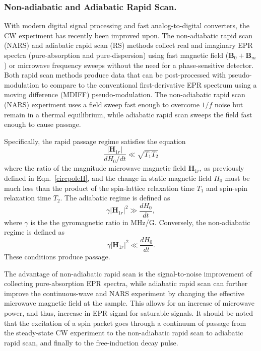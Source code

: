 \subsubsection*{Non-adiabatic and Adiabatic Rapid Scan.}
With modern digital signal processing and fast analog-to-digital converters, the CW experiment has recently been improved upon. The non-adiabatic rapid scan (NARS) \cite{KITTELL2011228, KITTELL201251, KITTELL201568, Hyde2013MDIFF, YU201558} and adiabatic rapid scan (RS) \cite{JOSHI200544,TSEITLIN200948, MITCHELL2012221, RScompare,MOSER2017} methods collect real and imaginary EPR spectra (pure-absorption and pure-dispersion) using fast magnetic field ($\mathbf{B}_0 + \mathbf{B}_m $) or microwave frequency sweeps without the need for a phase-sensitive detector. Both rapid scan methods produce data that can be post-processed with pseudo-modulation to compare to the conventional first-derivative EPR spectrum using a moving difference (MDIFF) pseudo-modulation. \cite{Hyde2013MDIFF} The non-adiabatic rapid scan (NARS) experiment uses a field sweep fast enough to overcome $1/f$ noise but remain in a thermal equilibrium, while adiabatic rapid scan sweeps the field fast enough to cause passage. \cite{Weger1960} 

Specifically, the rapid passage regime satisfies the equation
\begin{equation}
    \frac{|\mathbf{H}_{1r}|}{d H_0/dt} \ll \sqrt{T_1 T_2}
\end{equation}
where the ratio of the magnitude microwave magnetic field $\mathbf{H}_{1r}$, as previously defined in Eqn.~\ref{circpoleH}, and the change in static magnetic field $H_0$ must be much less than the product of the spin-lattice relaxation time $T_1$ and spin-spin relaxation time $T_2$. The adiabatic regime is defined as 
\begin{equation}
    \gamma |\mathbf{H}_{1r}|^2 \gg \frac{d H_0}{dt},
\end{equation}
where $\gamma$ is the the gyromagnetic ratio in MHz/G. Conversely, the non-adiabatic regime is defined as
\begin{equation}
    \gamma |\mathbf{H}_{1r}|^2 \ll \frac{d H_0}{dt}.
\end{equation}
These conditions produce passage. \cite{Weger1960}

The advantage of non-adiabatic rapid scan is the signal-to-noise improvement of collecting pure-absorption EPR spectra, while adiabatic rapid scan can further improve the continuous-wave and NARS experiment by changing the effective microwave magnetic field at the sample. This allows for an increase of microwave power, and thus, increase in EPR signal for saturable signals. \cite{JOSHI200544} It should be noted that the excitation of a spin packet goes through a continuum of passage from the steady-state CW experiment to the non-adiabatic rapid scan to adiabatic rapid scan, and finally to the free-induction decay pulse. 

